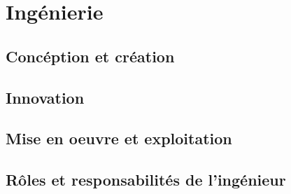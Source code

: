 \section{Ingénierie}

\subsection{Concéption et création}

\subsection{Innovation}

\subsection{Mise en oeuvre et exploitation}

\subsection{Rôles et responsabilités de l'ingénieur}